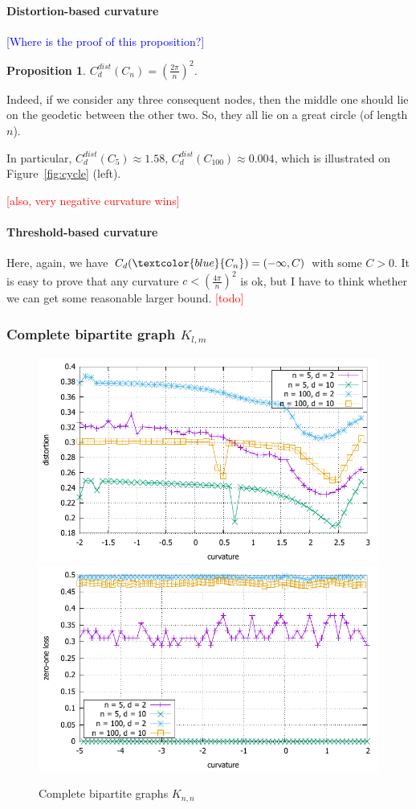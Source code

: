\documentclass{article} %
\newtheorem{proposition}[theorem]{Proposition}
\newcommand{\ph}[1]{\textcolor{blue}{#1}}
\begin{document}
\paragraph{Distortion-based curvature} 

\ph{[Where is the proof of this proposition?]}

\begin{proposition}\label{prop:cycle_distortion}
$C_d^{dist}(C_n) = \left(\frac{2\pi}{n}\right)^2$.
\end{proposition}

Indeed, if we consider any three consequent nodes, then the middle one should lie on the geodetic between the other two. So, they all lie on a great circle (of length $n$).

In particular, $C_d^{dist}(C_5) \approx 1.58$, $C_d^{dist}(C_{100}) \approx 0.004$, which is illustrated on Figure~\ref{fig:cycle} (left).

\textcolor{red}{[also, very negative curvature wins]}

\paragraph{Threshold-based curvature} 
Here, again, we have $C_d(\ph{C_n}) = (-\infty, C)$ with some $C>0$. It is easy to prove that any curvature $c < \left(\frac{4\pi}{n}\right)^2$ is ok, but I have to think whether we can get some reasonable larger bound. \textcolor{red}{[todo]}


\subsubsection{Complete bipartite graph $K_{l,m}$}

\begin{figure}
    \centering
    \includegraphics[width = 0.49 \textwidth]{bipartite_distortion.pdf}
    \includegraphics[width = 0.49 \textwidth]{bipartite_zero_one.pdf}
    \caption{Complete bipartite graphs $K_{n,n}$}
    \label{fig:bipartite}
\end{figure}
\end{document}
